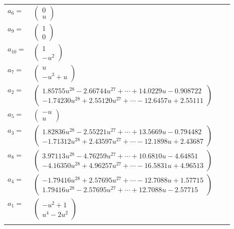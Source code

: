 \documentclass[1p]{elsarticle_modified}
\theoremstyle{definition}
\begin{document}
\begin{tabular}{m{7pt} m{180pt} m{7pt} m{180pt} }
\flushright $a_{6}=$&$\begin{pmatrix}0\\u\end{pmatrix}$ \\
\flushright $a_{9}=$&$\begin{pmatrix}1\\0\end{pmatrix}$ \\
\flushright $a_{10}=$&$\begin{pmatrix}1\\- u^2\end{pmatrix}$ \\
\flushright $a_{7}=$&$\begin{pmatrix}u\\- u^3+u\end{pmatrix}$ \\
\flushright $a_{2}=$&$\begin{pmatrix}1.85755 u^{28}-2.66744 u^{27}+\cdots+14.0229 u-0.908722\\-1.74230 u^{28}+2.55120 u^{27}+\cdots-12.6457 u+2.55111\end{pmatrix}$ \\
\flushright $a_{5}=$&$\begin{pmatrix}- u\\u\end{pmatrix}$ \\
\flushright $a_{3}=$&$\begin{pmatrix}1.82836 u^{28}-2.55221 u^{27}+\cdots+13.5669 u-0.794482\\-1.71312 u^{28}+2.43597 u^{27}+\cdots-12.1898 u+2.43687\end{pmatrix}$ \\
\flushright $a_{8}=$&$\begin{pmatrix}3.97113 u^{28}-4.76259 u^{27}+\cdots+10.6810 u-4.64851\\-4.16350 u^{28}+4.96257 u^{27}+\cdots-16.5831 u+4.96513\end{pmatrix}$ \\
\flushright $a_{4}=$&$\begin{pmatrix}-1.79416 u^{28}+2.57695 u^{27}+\cdots-12.7088 u+1.57715\\1.79416 u^{28}-2.57695 u^{27}+\cdots+12.7088 u-2.57715\end{pmatrix}$ \\
\flushright $a_{1}=$&$\begin{pmatrix}- u^2+1\\u^4-2 u^2\end{pmatrix}$\\&\end{tabular}
\end{document}
